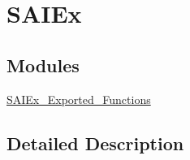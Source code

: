 \hypertarget{group___s_a_i_ex}{}\section{S\+A\+I\+Ex}
\label{group___s_a_i_ex}
\subsection*{Modules}
\begin{DoxyCompactItemize}
\item 
\hyperlink{group___s_a_i_ex___exported___functions}{S\+A\+I\+Ex\+\_\+\+Exported\+\_\+\+Functions}
\end{DoxyCompactItemize}


\subsection{Detailed Description}
